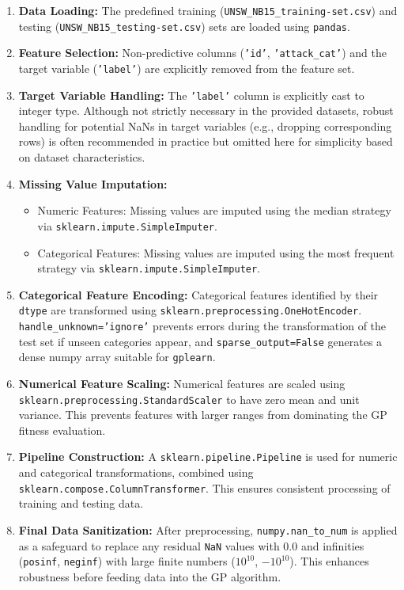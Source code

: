 \documentclass{article}
\begin{document}
\begin{enumerate}
    \item \textbf{Data Loading:} The predefined training (\texttt{UNSW\_NB15\_training-set.csv}) and testing (\texttt{UNSW\_NB15\_testing-set.csv}) sets are loaded using \texttt{pandas}.
    \item \textbf{Feature Selection:} Non-predictive columns (\texttt{'id'}, \texttt{'attack\_cat'}) and the target variable (\texttt{'label'}) are explicitly removed from the feature set.
    \item \textbf{Target Variable Handling:} The \texttt{'label'} column is explicitly cast to integer type. Although not strictly necessary in the provided datasets, robust handling for potential NaNs in target variables (e.g., dropping corresponding rows) is often recommended in practice but omitted here for simplicity based on dataset characteristics.
    \item \textbf{Missing Value Imputation:}
        \begin{itemize}
            \item Numeric Features: Missing values are imputed using the median strategy via \texttt{sklearn.impute.SimpleImputer}.
            \item Categorical Features: Missing values are imputed using the most frequent strategy via \texttt{sklearn.impute.SimpleImputer}.
        \end{itemize}
    \item \textbf{Categorical Feature Encoding:} Categorical features identified by their \texttt{dtype} are transformed using \texttt{sklearn.preprocessing.OneHotEncoder}. \texttt{handle\_unknown='ignore'} prevents errors during the transformation of the test set if unseen categories appear, and \texttt{sparse\_output=False} generates a dense numpy array suitable for \texttt{gplearn}.
    \item \textbf{Numerical Feature Scaling:} Numerical features are scaled using \texttt{sklearn.preprocessing.StandardScaler} to have zero mean and unit variance. This prevents features with larger ranges from dominating the GP fitness evaluation.
    \item \textbf{Pipeline Construction:} A \texttt{sklearn.pipeline.Pipeline} is used for numeric and categorical transformations, combined using \texttt{sklearn.compose.ColumnTransformer}. This ensures consistent processing of training and testing data.
    \item \textbf{Final Data Sanitization:} After preprocessing, \texttt{numpy.nan\_to\_num} is applied as a safeguard to replace any residual \texttt{NaN} values with 0.0 and infinities (\texttt{posinf}, \texttt{neginf}) with large finite numbers (\(10^{10}\), \(-10^{10}\)). This enhances robustness before feeding data into the GP algorithm.
\end{enumerate}
\end{document}

